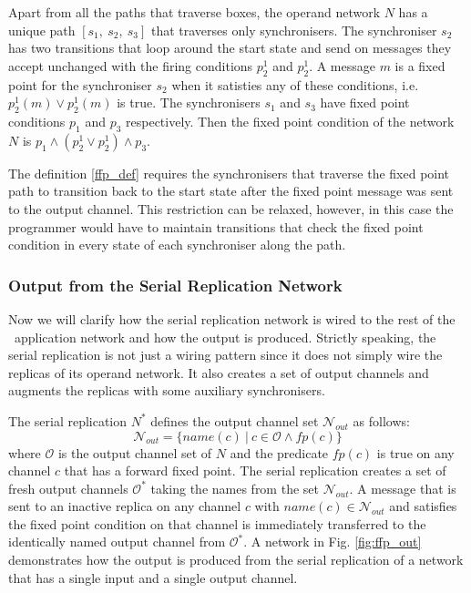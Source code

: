 Apart from all the paths that traverse boxes, the operand network $N$ has a unique path $[s_1, \: s_2, \: s_3]$ that traverses only synchronisers. The synchroniser $s_2$ has two transitions that loop around the start state and send on messages they accept unchanged with the firing conditions $p^{1}_2$ and $p^{1}_2$. A message $m$ is a fixed point for the synchroniser $s_2$ when it satisties any of these conditions, i.e. $p^{1}_2(m) \lor p^{1}_2(m)$ is true. The synchronisers $s_1$ and $s_3$ have fixed point conditions $p_1$ and $p_3$ respectively. 
Then the fixed point condition of the network $N$ is $p_1 \land (p^{1}_2 \lor p^{1}_2) \land p_3$.

The definition \ref{ffp_def} requires the synchronisers that traverse the fixed point path to transition back to the start state after the fixed point message was sent to the output channel. This restriction can be relaxed, however, in this case the programmer would have to maintain transitions that check the fixed point condition in every state of each synchroniser along the path.


    \subsubsection{Output from the Serial Replication Network}
Now we will clarify how the serial replication network is wired to the rest of the \ak\ application network and how the output is produced. Strictly speaking, the serial replication is not just a wiring pattern since it does not simply wire the replicas of its operand network. It also creates a set of output channels and augments the replicas with some auxiliary synchronisers.


The serial replication $N^{*}$ defines the output channel set $\mathcal{N}_{out}$ as follows:
\begin{equation}
\mathcal{N}_{out} = \{ name(c) \: | \: c \in \mathcal{O} \land fp(c) \}\nonumber
\end{equation}
where $\mathcal{O}$ is the output channel set of $N$ and the predicate $fp(c)$ is true on any channel $c$ that has a forward fixed point. The serial replication creates a set of fresh output channels $\mathcal{O}^{*}$ taking the names from the set $\mathcal{N}_{out}$. A message that is sent to an inactive replica on any channel $c$ with $name(c) \in \mathcal{N}_{out}$ and satisfies the fixed point condition on that channel is immediately transferred to the identically named output channel from $\mathcal{O}^{*}$. A network in Fig. \ref{fig:ffp_out} demonstrates how the output is produced from the serial replication of a network that has a single input and a single output channel.

